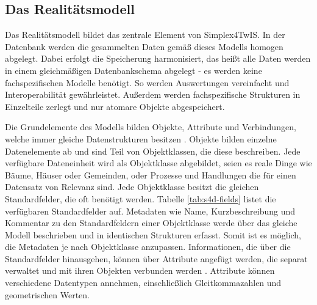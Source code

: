 \subsection{Das Realitätsmodell}
\label{sec:simplex-reality}

Das Realitätsmodell bildet das zentrale Element von Simplex4TwIS. In der Datenbank werden die gesammelten Daten gemäß dieses Modells homogen abgelegt. Dabei erfolgt die Speicherung harmonisiert, das heißt alle Daten werden in einem gleichmäßigen Datenbankschema abgelegt - es werden keine fachspezifischen Modelle benötigt. So werden Auswertungen vereinfacht und Interoperabilität gewährleistet. Außerdem werden fachspezifische Strukturen in Einzelteile zerlegt und nur atomare Objekte abgespeichert.

\pskip
Die Grundelemente des Modells bilden Objekte, Attribute und Verbindungen, welche immer gleiche Datenstrukturen besitzen \parencite{grossmannFachsystemeSchemaevolution2024}. Objekte bilden einzelne Datenelemente ab und sind Teil von Objektklassen, die diese beschreiben. Jede verfügbare Dateneinheit wird als Objektklasse abgebildet, seien es reale Dinge wie Bäume, Häuser oder Gemeinden, oder Prozesse und Handlungen die für einen Datensatz von Relevanz sind. Jede Objektklasse besitzt die gleichen Standardfelder, die oft benötigt werden. Tabelle \ref{tab:s4d-fields} listet die verfügbaren Standardfelder auf. Metadaten wie Name, Kurzbeschreibung und Kommentar zu den Standardfeldern einer Objektklasse werde über das gleiche Modell beschrieben und in identischen Strukturen erfasst. Somit ist es möglich, die Metadaten je nach Objektklasse anzupassen. Informationen, die über die Standardfelder hinausgehen, können über Attribute angefügt werden, die separat verwaltet und mit ihren Objekten verbunden werden \parencite{grossmannFachsystemeSchemaevolution2024}. Attribute können verschiedene Datentypen annehmen, einschließlich Gleitkommazahlen und geometrischen Werten.

